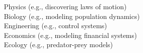 \documentclass[preview]{standalone}
\begin{document}
Physics (e.g., discovering laws of motion)\\Biology (e.g., modeling population dynamics)\\Engineering (e.g., control systems)\\Economics (e.g., modeling financial systems)\\Ecology (e.g., predator-prey models)\\
\end{document}
